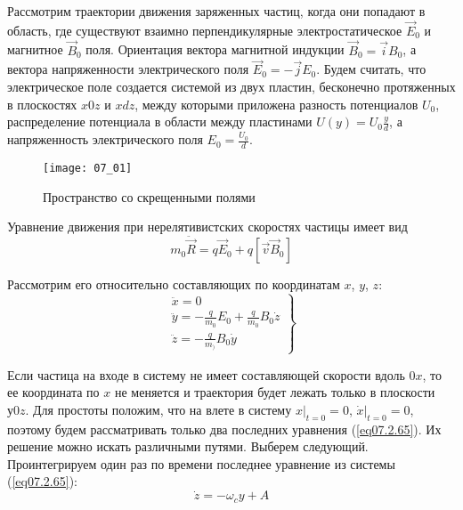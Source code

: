 
Рассмотрим траектории движения заряженных частиц, когда они попадают в 
область, где существуют взаимно перпендикулярные электростатическое 
\( \vec{E}_0 \) и магнитное \( \vec{B}_0 \) поля. Ориентация вектора магнитной 
индукции \( \vec{B}_0 = \vec{i}B_0 \), а вектора напряженности электрического 
поля \( \vec{E}_0 = -\vec{j}E_0 \). Будем считать, что электрическое поле
создается системой из двух пластин, бесконечно протяженных в плоскостях
\( x0z \) и \( xdz \), между которыми приложена разность потенциалов \( U_0 \),
распределение потенциала в области между пластинами 
\( U(y) = U_0 \frac{y}{d} \), а напряженность электрического поля 
\( E_0 = \frac{U_0}{d} \).

\begin{figure}[h!]
	\center
	\texttt{[image: 07\_01]}
	\caption{Пространство со скрещенными полями}
	\label{img07.1}
\end{figure}

Уравнение движения при нерелятивистских скоростях частицы имеет вид
\[
	m_0 \ddot{\vec{R}} = q\vec{E}_0 + q\left[ \vec{v}\vec{B}_0 \right]
\]

Рассмотрим его относительно составляющих по координатам 
\( x \), \( y \), \( z \):
\begin{equation}
	\left. \begin{array}{c}
		\ddot{x} = 0 \\
		\ddot{y} = -\frac{q}{m_0}E_0 + \frac{q}{m_0}B_0 \dot{z} \\
		\ddot{z} = -\frac{q}{m_)}B_0 \dot{y}
	\end{array} \right\}
	\label{eq07.2.65}
\end{equation}

Если частица на входе в систему не имеет составляющей скорости вдоль \( 0x \), 
то ее координата по \( x \) не меняется и траектория будет лежать только в 
плоскости \( у0z \). Для простоты положим, что на влете в систему 
\( x\Big|_{t=0} = 0\), \( \dot{x}\Big|_{t=0} = 0 \), поэтому будем 
рассматривать только два последних уравнения (\ref{eq07.2.65}). Их решение 
можно искать различными путями. Выберем следующий. Проинтегрируем один раз 
по времени последнее уравнение из системы (\ref{eq07.2.65}):
\begin{equation}
	\dot{z} = -\omega_c y + A
	\label{eq07.2.66}
\end{equation}

